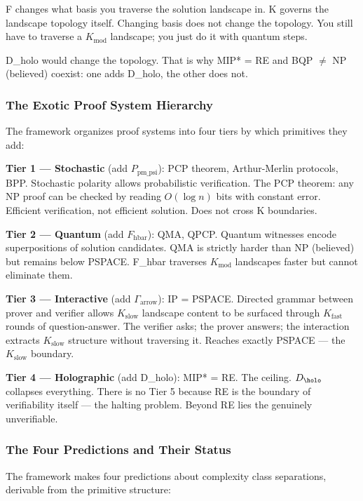 \documentclass[12pt,a4paper]{article}
\begin{document}
F changes what basis you traverse the solution landscape in. K governs the landscape topology itself. Changing basis does not change the topology. You still have to traverse a $K_{\text{mod}}$ landscape; you just do it with quantum steps.

D\_holo would change the topology. That is why MIP* = RE and BQP $\neq$ NP (believed) coexist: one adds D\_holo, the other does not.

\subsubsection{The Exotic Proof System Hierarchy}

The framework organizes proof systems into four tiers by which primitives they add:

\textbf{Tier 1 --- Stochastic} (add $P_{\text{pm\_psi}}$):
PCP theorem, Arthur-Merlin protocols, BPP. Stochastic polarity allows probabilistic verification. The PCP theorem: any NP proof can be checked by reading $O(\log n)$ bits with constant error. Efficient verification, not efficient solution. Does not cross K boundaries.

\textbf{Tier 2 --- Quantum} (add $F_{\text{hbar}}$):
QMA, QPCP. Quantum witnesses encode superpositions of solution candidates. QMA is strictly harder than NP (believed) but remains below PSPACE. F\_hbar traverses $K_{\text{mod}}$ landscapes faster but cannot eliminate them.

\textbf{Tier 3 --- Interactive} (add $\Gamma_{\text{arrow}}$):
IP = PSPACE. Directed grammar between prover and verifier allows $K_{\text{slow}}$ landscape content to be surfaced through $K_{\text{fast}}$ rounds of question-answer. The verifier asks; the prover answers; the interaction extracts $K_{\text{slow}}$ structure without traversing it. Reaches exactly PSPACE --- the $K_{\text{slow}}$ boundary.

\textbf{Tier 4 --- Holographic} (add D\_holo):
MIP* = RE. The ceiling. $D_{\holo}$ collapses everything. There is no Tier 5 because RE is the boundary of verifiability itself --- the halting problem. Beyond RE lies the genuinely unverifiable.

\subsubsection{The Four Predictions and Their Status}

The framework makes four predictions about complexity class separations, derivable from the primitive structure:
\end{document}
